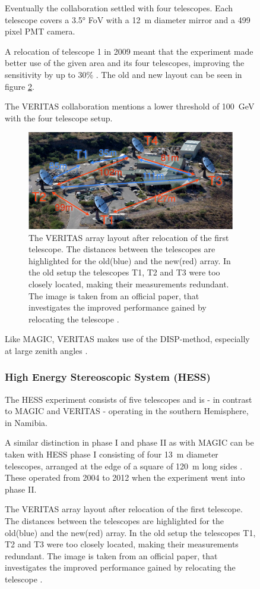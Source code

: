 \begin{figure}
Eventually the collaboration settled 
with four telescopes. 
Each telescope covers a 3.5° FoV with a \SI{12}{\meter} diameter mirror and 
a 499 pixel PMT camera.

A relocation of telescope 1 in 2009 meant that the 
experiment made better use of the given area and its four telescopes,
improving the sensitivity by up to 30\% \cite{2009arXiv0912.3841P}.
The old and new layout can be seen in figure \ref{fig:veritas_relocation}.

The VERITAS collaboration mentions a lower threshold of \SI{100}{\giga\electronvolt}
with the four telescope setup.

\begin{figure}
	\center
	\captionsetup{width=0.9\linewidth}
	\includegraphics[width=.9\textwidth]{images/veritas_relocation.png}
	\caption{The VERITAS array layout after relocation of the first 
		telescope. The distances between the telescopes are 
		highlighted for the old(blue) and the new(red) array.
		In the old setup the telescopes T1, T2 and T3 were too closely
		located, making their measurements redundant.
	 	The image is taken from an official paper, that investigates
		the improved performance gained by relocating the telescope \cite{2009arXiv0912.3841P}.}
	\label{fig:veritas_relocation}
\end{figure}

Like MAGIC, VERITAS makes use of the DISP-method, especially at large zenith angles 
\cite{2015ICRC...34..771P}.

\subsubsection{High Energy Stereoscopic System (HESS)}

The HESS experiment consists of five telescopes and 
is - in contrast to MAGIC and VERITAS - operating in the southern 
Hemisphere, in Namibia.

A similar distinction in phase I and phase II as with MAGIC can be taken with 
HESS phase I consisting of four \SI{13}{\meter} diameter telescopes,
arranged at the edge of a square of \SI{120}{\meter} long sides \cite{HINTON2004331}.
These operated from 2004 to 2012 when the experiment went into phase II.


\end{figure}
